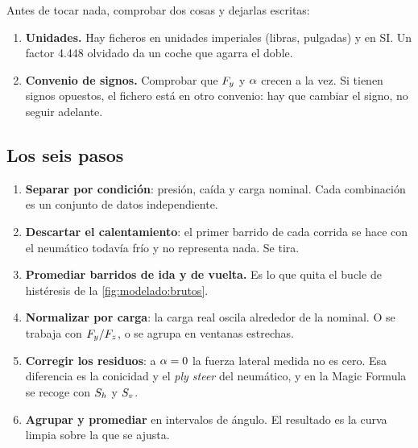 \begin{ojo}
Antes de tocar nada, comprobar dos cosas y dejarlas escritas:

\begin{enumerate}
  \item \textbf{Unidades.} Hay ficheros en unidades imperiales (libras,
        pulgadas) y en SI. Un factor \num{4.448} olvidado da un coche que agarra
        el doble.
  \item \textbf{Convenio de signos.} Comprobar que $F_y$ y $\alpha$ crecen a la
        vez. Si tienen signos opuestos, el fichero está en otro convenio: hay que
        cambiar el signo, no seguir adelante.
\end{enumerate}
\end{ojo}

\subsection{Los seis pasos}

\begin{enumerate}
  \item \textbf{Separar por condición}: presión, caída y carga nominal. Cada
        combinación es un conjunto de datos independiente.
  \item \textbf{Descartar el calentamiento}: el primer barrido de cada corrida se
        hace con el neumático todavía frío y no representa nada. Se tira.
  \item \textbf{Promediar barridos de ida y de vuelta.} Es lo que quita el bucle
        de histéresis de la \cref{fig:modelado:brutos}.
  \item \textbf{Normalizar por carga}: la carga real oscila alrededor de la
        nominal. O se trabaja con $F_y/F_z$, o se agrupa en ventanas estrechas.
  \item \textbf{Corregir los residuos}: a $\alpha = 0$ la fuerza lateral medida
        no es cero. Esa diferencia es la conicidad y el \emph{ply steer} del
        neumático, y en la Magic Formula se recoge con $S_h$ y $S_v$.
  \item \textbf{Agrupar y promediar} en intervalos de ángulo. El resultado es la
        curva limpia sobre la que se ajusta.
\end{enumerate}

